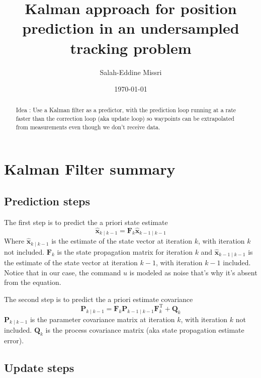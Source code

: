 \documentclass[12pt]{article}
\begin{document}
\title{Kalman approach for position prediction in an undersampled tracking problem}
\author{Salah-Eddine Missri}
\date{\today}
\maketitle

\begin{abstract}
Idea : Use a Kalman filter as a predictor, with the prediction loop running at a rate faster than the correction loop (aka update loop) so waypoints can be extrapolated from measurements even though we don't receive data.
\end{abstract}


\section{Kalman Filter summary}

\subsection{Prediction steps}

The first step is to predict the a priori state estimate
\begin{equation}
\hat{\mathbf{x}}_{k\mid k-1} = \mathbf{F}_{k}\hat{\mathbf{x}}_{k-1\mid k-1}
\end{equation}
Where $\hat{\mathbf{x}}_{k\mid k-1}$ is the estimate of the state vector at iteration $k$, with iteration $k$ not included.
$\mathbf{F}_{k}$ is the state propagation matrix for iteration $k$ and $\hat{\mathbf{x}}_{k-1\mid k-1}$ is the estimate of the state vector at iteration $k-1$, with iteration $k-1$ included.
Notice that in our case, the command $u$ is modeled as noise that's why it's absent from the equation.

The second step is to predict the a priori estimate covariance
\begin{equation}
\mathbf{P}_{k\mid k-1} = \mathbf{F}_{k} \mathbf{P}_{k-1\mid k-1} \mathbf{F}_{k}^{\text{T}} + \mathbf{Q}_{k}
\end{equation}
$\mathbf{P}_{k\mid k-1}$ is the parameter covariance matrix at iteration $k$, with iteration $k$ not included.
$\mathbf{Q}_{k}$ is the process covariance matrix (aka state propagation estimate error).

\subsection{Update steps}
\end{document}

